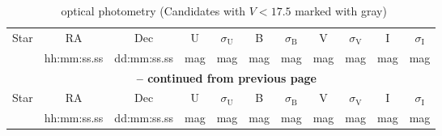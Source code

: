 \begin{longtable}{ccccccccccc}
\caption{\ optical photometry (Candidates with $V<17.5$ marked with gray)}
\label{tab:sn1006_photometry}\\ 
\hline\multicolumn{1}{c}{Star} & \multicolumn{1}{c}{RA} & \multicolumn{1}{c}{Dec} & \multicolumn{1}{c}{U} & \multicolumn{1}{c}{$\sigma_\textrm{U}$} & \multicolumn{1}{c}{B} & \multicolumn{1}{c}{$\sigma_\textrm{B}$} & \multicolumn{1}{c}{V} & \multicolumn{1}{c}{$\sigma_\textrm{V}$} & \multicolumn{1}{c}{I} & \multicolumn{1}{c}{$\sigma_\textrm{I}$}\\ 
\multicolumn{1}{c}{} & \multicolumn{1}{c}{hh:mm:ss.ss} & \multicolumn{1}{c}{dd:mm:ss.ss} & \multicolumn{1}{c}{mag} & \multicolumn{1}{c}{mag} & \multicolumn{1}{c}{mag} & \multicolumn{1}{c}{mag} & \multicolumn{1}{c}{mag} & \multicolumn{1}{c}{mag} & \multicolumn{1}{c}{mag} & \multicolumn{1}{c}{mag}\\ \hline
\endfirsthead

\multicolumn{11}{c}{{\bfseries \tablename\ \thetable{} -- continued from previous page}} \\ \hline
\multicolumn{1}{c}{Star} & \multicolumn{1}{c}{RA} & \multicolumn{1}{c}{Dec} & \multicolumn{1}{c}{U} & \multicolumn{1}{c}{$\sigma_\textrm{U}$} & \multicolumn{1}{c}{B} & \multicolumn{1}{c}{$\sigma_\textrm{B}$} & \multicolumn{1}{c}{V} & \multicolumn{1}{c}{$\sigma_\textrm{V}$} & \multicolumn{1}{c}{I} & \multicolumn{1}{c}{$\sigma_\textrm{I}$}\\ 
\multicolumn{1}{c}{} & \multicolumn{1}{c}{hh:mm:ss.ss} & \multicolumn{1}{c}{dd:mm:ss.ss} & \multicolumn{1}{c}{mag} & \multicolumn{1}{c}{mag} & \multicolumn{1}{c}{mag} & \multicolumn{1}{c}{mag} & \multicolumn{1}{c}{mag} & \multicolumn{1}{c}{mag} & \multicolumn{1}{c}{mag} & \multicolumn{1}{c}{mag}\\ \hline
\endhead


\end{longtable}
